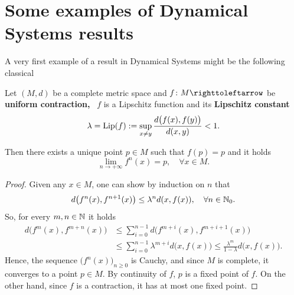 \section{Some examples of Dynamical Systems results}\label{sec:some-exampl-dynamical-sys-res}

A very first example of a result in Dynamical Systems might be the following classical

\begin{theorem}\label{thm:Banach-fixed-point-thm}
  Let $(M,d)$ be a complete metric space and $f\colon M\carr$ be \textbf{uniform contraction,} \ie~$f$ is a Lipschitz function and its \textbf{Lipschitz constant}
  \begin{displaymath}
    \lambda=\operatorname{Lip}(f):=\sup_{x\neq y}\frac{d\big(f(x),f(y)\big)}{d(x,y)}< 1.
  \end{displaymath}

  Then there exists a unique point $p\in M$ such that $f(p)=p$ and it holds
  \begin{displaymath}
    \lim_{n\to+\infty} f^{n}(x)=p, \quad\forall x\in M.
  \end{displaymath}
\end{theorem}

\begin{proof}
  Given any $x\in M$, one can show by induction on $n$ that
  \begin{displaymath}
    d\big(f^{n}(x),f^{n+1}(x)\big)\leq \lambda^{n}d(x,f(x)), \quad\forall n\in\mathbb{N}_{0}.
  \end{displaymath}
  So, for every $m,n\in\mathbb{N}$ it holds
  \begin{displaymath}
    \begin{split}
      d\big(f^{m}(x),f^{m+n}(x)\big)&\leq \sum_{i=0}^{n-1} d\big(f^{m+i}(x),f^{m+i+1}(x)\big) \\
      &\leq \sum_{i=0}^{n-1}\lambda^{m+i}d\big(x,f(x)\big) \leq \frac{\lambda^{m}}{1-\lambda} d\big(x,f(x)\big).
    \end{split}
  \end{displaymath}
  Hence, the sequence ${\big(f^{n}(x)\big)}_{n\geq 0}$ is Cauchy, and since $M$ is complete, it converges to a point $p\in M$. By continuity of $f$, $p$ is a fixed point of $f$. On the other hand, since $f$ is a contraction, it has at most one fixed point.
\end{proof}

